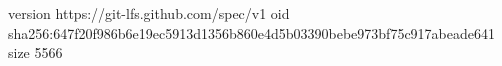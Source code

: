 version https://git-lfs.github.com/spec/v1
oid sha256:647f20f986b6e19ec5913d1356b860e4d5b03390bebe973bf75c917abeade641
size 5566
